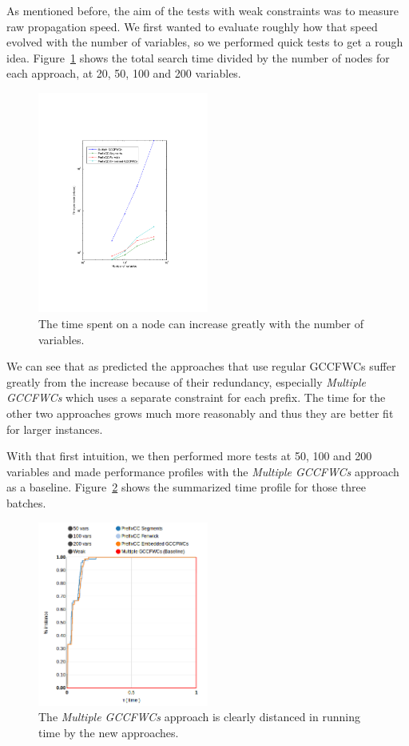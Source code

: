 \documentclass[a4paper,10pt]{article}
\begin{document}
As mentioned before, the aim of the tests with weak constraints was to measure raw propagation speed. We first wanted to evaluate roughly how that speed evolved with the number of variables, so we performed quick tests to get a rough idea. Figure~\ref{fig:loglog-complexity} shows the total search time divided by the number of nodes for each approach, at 20, 50, 100 and 200 variables.

\begin{figure}
    \centering
    \includegraphics[trim = 4cm 6cm 4cm 6cm, width=0.5\textwidth]{img/loglog-graph}
    \caption{The time spent on a node can increase greatly with the number of variables.}
    \label{fig:loglog-complexity}
\end{figure}

We can see that as predicted the approaches that use regular GCCFWCs suffer greatly from the increase because of their redundancy, especially \emph{Multiple GCCFWCs} which uses a separate constraint for each prefix. The time for the other two approaches grows much more reasonably and thus they are better fit for larger instances.

With that first intuition, we then performed more tests at 50, 100 and 200 variables and made performance profiles with the \emph{Multiple GCCFWCs} approach as a baseline. Figure~\ref{fig:weak-all-time-static} shows the summarized time profile for those three batches.

\begin{figure}
    \centering
    \includegraphics[width=0.5\textwidth]{img/weak-all-time-static}
    \caption{The \emph{Multiple GCCFWCs} approach is clearly distanced in running time by the new approaches.}
    \label{fig:weak-all-time-static}
\end{figure}
\end{document}
